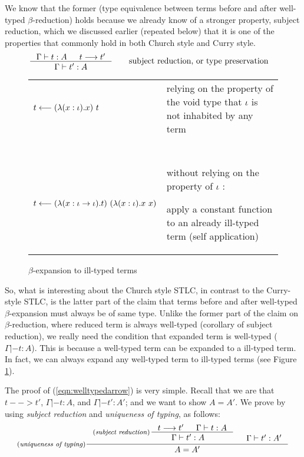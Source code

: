 We know that the former (type equivalence between terms before and after
well-typed $\beta$-reduction) holds because we already know of
a stronger property, subject reduction, which we discussed earlier
(repeated below) that it is one of the properties that commonly hold
in both Church style and Curry style.
\begin{align*}
\inference{\Gamma |- t : A  & t --> t'}{\Gamma |- t' : A}
 &\qquad \text{subject reduction, or type preservation}
\end{align*}

\begin{figure}
\begin{singlespace}
\begin{tabular}{lp{7cm}}
$t <-- (\lambda(x:\iota).x)~t$ &
relying on the property of the void type
that $\iota$ is not inhabited by any term
\\ ~ \\
$t <-- (\lambda(x:\iota -> \iota).t)~(\lambda(x:\iota).x~x)$ &
without relying on the property of $\iota$ : \par
apply a constant function to an already ill-typed term (self application)
\end{tabular}
\end{singlespace}
\caption{$\beta$-expansion to ill-typed terms}
\label{ill-typed_expand}
\end{figure}

So, what is interesting about the Church style STLC, in contrast to
the Curry-style STLC, is the latter part of the claim that terms before and
after well-typed $\beta$-expansion must always be of same type. Unlike
the former part of the claim on $\beta$-reduction, where reduced term
is always well-typed (corollary of subject reduction), we really need
the condition that expanded term is well-typed ($\Gamma |- t : A$).
This is because a well-typed term can be expanded to a ill-typed term.
In fact, we can always expand any well-typed term to ill-typed terms
(see Figure \ref{ill-typed_expand}).

The proof of (\ref{eqn:welltypedarrow}) is very simple.
Recall that we are that $t --> t'$, $\Gamma |- t : A$,
and $\Gamma |- t' : A'$; and we want to show $A = A'$.
We prove by using \emph{subject reduction} and \emph{uniqueness of typing},
as follows:
\[ \inference[(\emph{uniqueness of typing})]
	{ \inference[(\emph{subject reduction})\!\!\!]
		{t --> t' & \Gamma |- t : A}
		{\Gamma |- t' : A \phantom{a_f}} 
	& \Gamma |- t' : A' }
	{ A = A' }
\]

